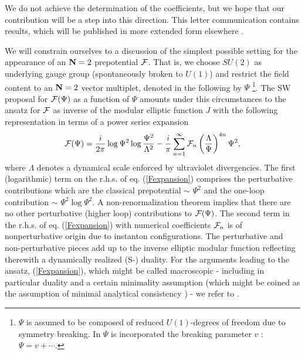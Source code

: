 \documentclass[a4paper,12pt]{article}
\begin{document}
We do not achieve the determination of the coefficients, 
but we hope that our contribution will be a step into this direction. 
This letter communication contains results, which will be published 
in more extended form elsewhere \cite{fps}.  

We will constrain ourselves to a discussion of the simplest 
possible setting for the appearance of an ${\bf N}=2$ prepotential 
${\cal F}$. 
That is, we choose $SU(2)$ as underlying gauge group (spontaneously 
broken to $U(1)$) and restrict the field content to an ${\bf N}=2$ 
vector multiplet, denoted in the following by $\Psi$ \footnote{$\Psi$ 
is assumed to be composed of 
reduced $U(1)$-degrees of freedom due to symmetry breaking. In $\Psi$ is 
incorporated the breaking parameter $v$ : $\Psi=v+ \cdots$.}. 
The SW proposal for ${\cal F}(\Psi)$ as a function of $\Psi$ amounts 
under this circumstances to the ansatz for ${\cal F}$ as inverse of 
the  modular elliptic function $J$ \cite{erdelyi} with the following 
representation in terms of a power series expansion
\begin{equation}
{\cal F}(\Psi)=\frac{i}{2\pi} \log \Psi^2\log \frac{\Psi^2}{\Lambda^2} 
-\frac{i}{\pi}\sum_{n=1}^{\infty}{\cal F}_n \left(\frac{\Lambda}{\Psi}
\right)^{4n} \Psi^2, 
\label{Fexpansion}
\end{equation}   
where $\Lambda$ denotes a dynamical scale enforced by ultraviolet 
divergencies. The first (logarithmic) term on the r.h.s. of eq. 
(\ref{Fexpansion}) comprises the perturbative contributions which 
are the classical prepotential $\sim$ $\Psi^2$ and the one-loop 
contribution $\sim$  $\Psi^2 \log \Psi^2$. A non-renormalization 
theorem \cite{s2} implies that there are no other perturbative 
(higher loop) contributions to ${\cal F}(\Psi)$. 
The second term in the r.h.s. of eq. (\ref{Fexpansion}) with 
numerical coefficients ${\cal F}_n$ is of nonperturbative origin 
due to instanton configurations. The perturbative and non-perturbative 
pieces add up to the inverse elliptic modular function reflecting 
therewith a dynamically realized (S-) duality. For the arguments 
leading to the ansatz, (\ref{Fexpansion}), which might be called 
macroscopic - including in particular duality and a certain 
minimality assumption (which might be coined as the assumption of minimal 
analytical consistency \cite{flume}) - 
we refer to \cite{sw1}. 
\end{document}
